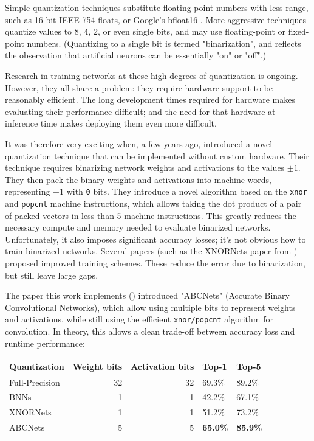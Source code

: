 \documentclass[12pt]{article}
\begin{document}
Simple quantization techniques substitute floating point numbers with less range, such as 16-bit IEEE 754 floats, or Google's bfloat16 \citep{bfloat16}. More aggressive techniques quantize values to 8, 4, 2, or even single bits, and may use floating-point or fixed-point numbers.
(Quantizing to a single bit is termed "binarization", and reflects the observation that artificial neurons can be essentially "on" or "off".)

Research in training networks at these high degrees of quantization is ongoing. However, they all share a problem: they require hardware support to be reasonably efficient. The long development times required for hardware makes evaluating their performance difficult; and the need for that hardware at inference time makes deploying them even more difficult.

It was therefore very exciting when, a few years ago, \citet{BinarizedNeuralNetworks} introduced a novel quantization technique that can be implemented without custom hardware.
Their technique requires binarizing network weights and activations to the values \(\pm 1\).
They then pack the binary weights and activations into machine words, representing \(-1\) with \texttt{0} bits. They introduce a novel algorithm based on the \texttt{xnor} and \texttt{popcnt} machine instructions, which allows taking the dot product of a pair of packed vectors in less than 5 machine instructions.
This greatly reduces the necessary compute and memory needed to evaluate binarized networks. Unfortunately, it also imposes significant accuracy losses; it's not obvious how to train binarized networks. Several papers (such as the XNORNets paper from \citet{XNORNets}) proposed improved training schemes. These reduce the error due to binarization, but still leave large gaps.

The paper this work implements (\citet{ABCNets}) introduced "ABCNets" (Accurate Binary Convolutional Networks), which allow using multiple bits to represent weights and activations,
while still using the efficient \texttt{xnor/popcnt} algorithm for convolution. In theory, this allows a clean trade-off between accuracy loss and runtime performance:

\begin{center}
\begin{tabular}{lrrll}
Quantization & Weight bits & Activation bits & Top-1 & Top-5\\
\hline
Full-Precision & 32 & 32 & 69.3\% & 89.2\%\\
BNNs & 1 & 1 & 42.2\% & 67.1\%\\
XNORNets & 1 & 1 & 51.2\% & 73.2\%\\
ABCNets & 5 & 5 & \textbf{65.0\%} & \textbf{85.9\%}\\
\end{tabular}
\end{center}
\end{document}
